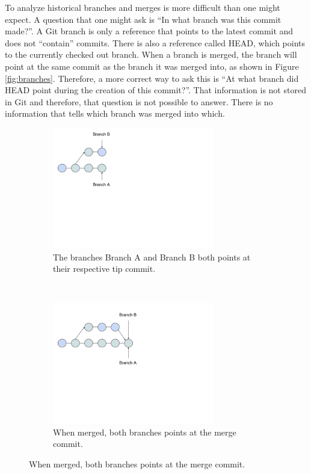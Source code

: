 To analyze historical branches and merges is more difficult than one might expect. A question that one might ask is “In what branch was this commit made?”. A Git branch is only a reference that points to the latest commit and does not “contain” commits. There is also a reference called HEAD, which points to the currently checked out branch. When a branch is merged, the branch will point at the same commit as the branch it was merged into, as shown in Figure \ref{fig:branches}. Therefore, a more correct way to ask this is “At what branch did HEAD point during the creation of this commit?”. That information is not stored in Git and therefore, that question is not possible to answer. There is no information that tells which branch was merged into which.
\begin{figure}
 \centering
 \begin{subfigure}[b]{0.3\textwidth}
     \includegraphics[width=200pt]{figure/branch1.png}
     \caption{The branches Branch A and Branch B both points at their respective tip commit.}
     \label{fig:mbranch1}
 \end{subfigure}
 ~ %
 \begin{subfigure}[b]{0.3\textwidth}
     \includegraphics[width=200pt]{figure/branch2.png}
     \caption{When merged, both branches points at the merge commit.}
     \label{fig:mbranch2}
 \end{subfigure}

\end{figure}

